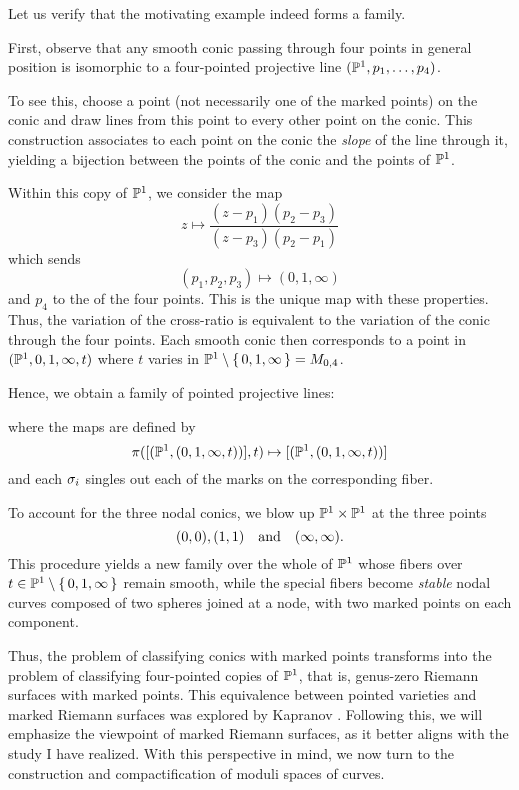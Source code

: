 \documentclass[12pt]{memoir}
\begin{document}
\begin{Ex}
    Let us verify that the motivating example indeed forms a family.\par
First, observe that any smooth conic passing through four points in general position is isomorphic to a four-pointed projective line $(\mathbb{P}^1, p_1, \dotsc, p_4)$.
\begin{ptcb}
    To see this, choose a point (not necessarily one of the marked points) on the conic and draw lines from this point to every other point on the conic. This construction associates to each point on the conic the \emph{slope} of the line through it, yielding a bijection between the points of the conic and the points of $\mathbb{P}^1$.
\end{ptcb}
Within this copy of $\mathbb{P}^1$, we consider the map
    $$z\mapsto\frac{(z-p_1)(p_2-p_3)}{(z-p_3)(p_2-p_1)}$$
    which sends
    $$(p_1,p_2,p_3)\mapsto(0,1,\infty)$$ 
    and $p_4$ to the  of the four points. This is the unique map with these properties. Thus, the variation of the cross-ratio is equivalent to the variation of the conic through the four points. Each smooth conic then corresponds to a point in $(\mathbb{P}^1, 0, 1, \infty, t)$ where $t$ varies in $\mathbb{P}^1 \setminus \{\,0,1,\infty\,\} = M_{0,4}$.\par
    Hence, we obtain a family of pointed projective lines:
    \begin{center}
    \end{center}
    where the maps are defined by
    $$\pi([(\mathbb{P}^1,(0,1,\infty,t))],t)\mapsto [(\mathbb{P}^1,(0,1,\infty,t))]$$
    and each $\sigma_i$ singles out each of the marks on the corresponding fiber.\par
    To account for the three nodal conics, we blow up $\mathbb{P}^1 \times \mathbb{P}^1$ at the three points
    $$(0,0),(1,1)\quad\text{and}\quad(\infty,\infty).$$
    This procedure yields a new family over the whole of $\mathbb{P}^1$ whose fibers over $t \in \mathbb{P}^1 \setminus \{\,0,1,\infty\,\}$ remain smooth, while the special fibers become \emph{stable} nodal curves composed of two spheres joined at a node, with two marked points on each component.
\end{Ex}

Thus, the problem of classifying conics with marked points transforms into the problem of classifying four-pointed copies of $\mathbb{P}^1$, that is, genus-zero Riemann surfaces with marked points. This equivalence between pointed varieties and marked Riemann surfaces was explored by Kapranov \cite{KapranovPaper}. Following this, we will emphasize the viewpoint of marked Riemann surfaces, as it better aligns with the study I have realized. With this perspective in mind, we now turn to the construction and compactification of moduli spaces of curves.
\end{document}
